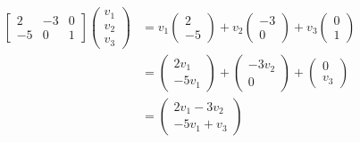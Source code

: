 \begin{example}
\begin{align*}
\left[\begin{array}{rrr}
2 & {-3} & 0 \\
{-5} & 0 & 1 \end{array}\right]\begin{pmatrix}v_1\\ v_2 \\ v_3 \end{pmatrix}
&=v_1\left(\begin{array}{r}2\\{-5}\end{array}\right)+v_2\left(\begin{array}{r}{-3}\\0\end{array}\right)+v_3\left(\begin{array}{r}0\\1\end{array}\right)\\
&=\left(\begin{array}{r}2v_1\\{-5v_1}\end{array}\right)+\left(\begin{array}{r}{-3v_2}\\ 0\end{array}\right)+\left(\begin{array}{r}0\\v_3\end{array}\right)\\
&=\left(\begin{array}{c}2v_1-3v_2\\-5v_1+v_3\end{array}\right)
\end{align*}
\end{example}

